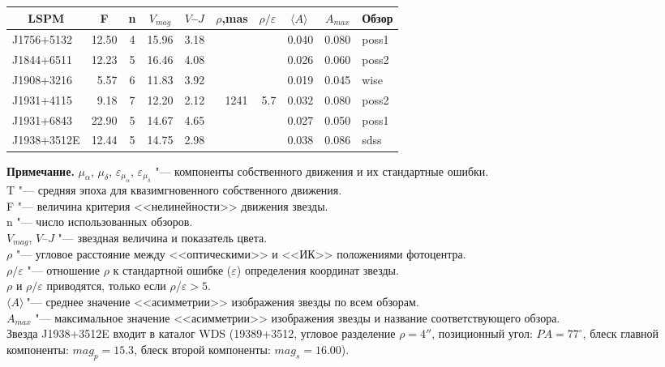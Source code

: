 \begin{table}[htbp]
\begin{tabularx}{\textwidth}{l|r|c|r|r|r|r|r|r|l}
\multicolumn{1}{c|}{LSPM}&\multicolumn{1}{c|}{F}&\multicolumn{1}{c|}{n}&\multicolumn{1}{c|}{$V_{mag}$}&\multicolumn{1}{c|}{{\small$V$--$J$}}&\multicolumn{1}{c|}{$\rho$,mas}&\multicolumn{1}{c|}{$\rho/\varepsilon$}&\multicolumn{1}{c|}{$\langle A\rangle\ $}&\multicolumn{1}{c|}{$A_{max}$}& \multicolumn{1}{c}{Обзор}\\ \hline
        J1756+5132 & 12.50& 4 & 15.96& 3.18 &     &     & 0.040& 0.080& poss1\\
J1844+6511 & 12.23& 5 & 16.46& 4.08 &     &     & 0.026& 0.060& poss2\\
J1908+3216 &  5.57& 6 & 11.83& 3.92 &     &     & 0.019& 0.045& wise\\
J1931+4115 &  9.18& 7 & 12.20& 2.12 & 1241&  5.7& 0.032& 0.080& poss2\\
J1931+6843 & 22.90& 5 & 14.67& 4.65 &     &     & 0.027& 0.050& poss1\\
J1938+3512E& 12.44& 5 & 14.75& 2.98 &     &     & 0.038& 0.086& sdss\\
\hline
\end{tabularx}
\begin{flushleft}
\footnotesize
\textbf{Примечание.} $\mu_{\alpha}$, $\mu_{\delta}$, $\varepsilon_{\mu_{\alpha}}$, $\varepsilon_{\mu_{\delta}}$ "--- компоненты собственного движения и их стандартные ошибки.\\T "--- средняя эпоха для квазимгновенного собственного движения.\\F "--- величина критерия <<нелинейности>> движения звезды.\\ n "--- число использованных обзоров.\\ $V_{mag}$, {\small$V$--$J$} "--- звездная величина и показатель цвета. \\ $\rho$ "--- угловое расстояние между <<оптическими>> и <<ИК>> положениями фотоцентра. \\ $\rho/\varepsilon$ "--- отношение $\rho$ к стандартной ошибке ($\varepsilon$) определения координат звезды. \\ $\rho$ и $\rho/\varepsilon$ приводятся, только если $\rho/\varepsilon>5$. \\ $\langle A\rangle\ $"--- среднее значение <<асимметрии>> изображения звезды по всем обзорам. \\ $A_{max}$ "--- максимальное значение <<асимметрии>> изображения звезды и название соответствующего обзора. \\ Звезда J1938+3512E входит в каталог WDS (19389+3512, угловое разделение $\rho=4''$, позиционный угол: $PA=77^{\circ}$, блеск главной компоненты: $mag_p = 15.3$, блеск второй компоненты: $mag_s=16.00$).
\end{flushleft}
\end{table}




